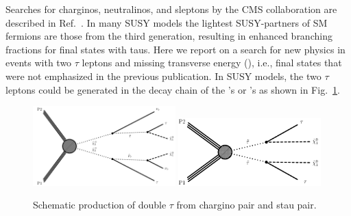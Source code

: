 Searches for charginos, neutralinos, and sleptons by the CMS collaboration are described in Ref.~\cite{Khachatryan:2014qwa}.  
In many SUSY models \cite{Martin:1997ns} the lightest SUSY-partners of SM fermions are those from the third generation,
resulting in enhanced branching fractions for final states with taus.  Here we report on a search for new physics in events
with two $\tau$ leptons and missing transverse energy (\MET), i.e., final states that were not emphasized in the previous publication.
In SUSY models, the two $\tau$ leptons could be generated in the decay chain of the \sTau's or \PSGcpDo's as shown in Fig.~\ref{fig:Productions}. 

\begin{figure}[!Hhtb]
\centering
\includegraphics[width=0.49\textwidth]{Introductionfigs/TChipmSlepSnu.pdf}
\includegraphics[width=0.49\textwidth]{Introductionfigs/TSlepSlep.pdf}
\caption{Schematic production of double $\tau$ from chargino pair and stau pair.}
\label{fig:Productions}
\end{figure}

